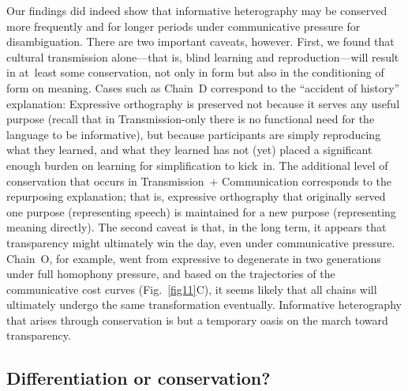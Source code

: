 \documentclass[doc,biblatex]{apa7}
\begin{document}
Our findings did indeed show that informative heterography may be conserved more frequently and for longer periods under communicative pressure for disambiguation. There are two important caveats, however. First, we found that cultural transmission alone---that is, blind learning and reproduction---will result in at~least some conservation, not only in form but also in the conditioning of form on meaning. Cases such as Chain~D correspond to the ``accident of history'' explanation: Expressive orthography is preserved not because it serves any useful purpose (recall that in Transmission-only there is no functional need for the language to be informative), but because participants are simply reproducing what they learned, and what they learned has not (yet) placed a significant enough burden on learning for simplification to kick~in. The additional level of conservation that occurs in Transmission~+ Communication corresponds to the repurposing explanation; that is, expressive orthography that originally served one purpose (representing speech) is maintained for a new purpose (representing meaning directly). The second caveat is that, in the long term, it appears that transparency might ultimately win the day, even under communicative pressure. Chain~O, for example, went from expressive to degenerate in two generations under full homophony pressure, and based on the trajectories of the communicative cost curves (Fig.~\ref{fig11}C), it seems likely that all chains will ultimately undergo the same transformation eventually. Informative heterography that arises through conservation is but a temporary oasis on the march toward transparency.

\subsection{Differentiation or conservation?}
\end{document}
